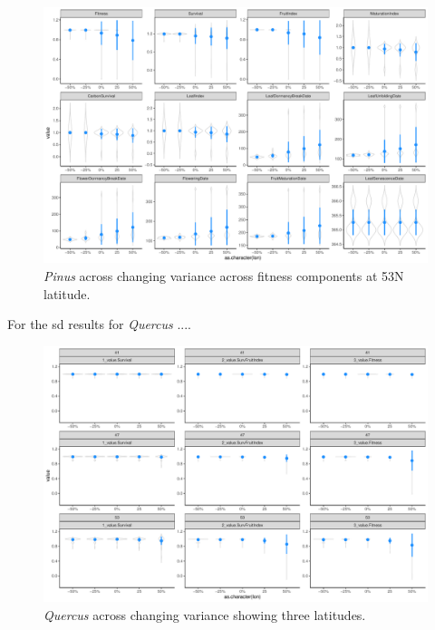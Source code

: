 \documentclass[11pt,letter]{article}
\begin{document}
\begin{figure} 
 \begin{center}
\noindent \includegraphics[width=1\textwidth]{..//analyses/graphs/phenofit/sims/sdsim53_allmetricsPS.pdf}
  \caption{\emph{Pinus} across changing variance across fitness components at 53\degree N latitude. }
  \label{fig:pinussd53}
  \end{center}
\end{figure}

\clearpage

For the sd results for \emph{Quercus} ....

\begin{figure} 
 \begin{center}
\noindent \includegraphics[width=1\textwidth]{..//analyses/graphs/phenofit/sims/metrics3/sdsim_3metricsQR.pdf}
  \caption{\emph{Quercus} across changing variance showing three latitudes.}
  \label{fig:quercussd3}
  \end{center}
\end{figure}
\end{document}
